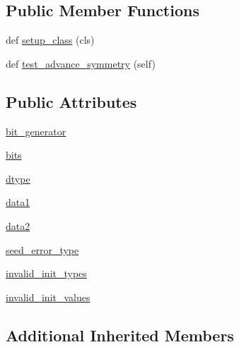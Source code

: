 \subsection*{Public Member Functions}
\begin{DoxyCompactItemize}
\item 
def \hyperlink{classnumpy_1_1random_1_1tests_1_1test__direct_1_1TestPCG64DXSM_a3e646542cb868d5f82de0fcd3b3f2964}{setup\+\_\+class} (cls)
\item 
def \hyperlink{classnumpy_1_1random_1_1tests_1_1test__direct_1_1TestPCG64DXSM_aae1696cb76a3c24ca72e1739e9b5fac0}{test\+\_\+advance\+\_\+symmetry} (self)
\end{DoxyCompactItemize}
\subsection*{Public Attributes}
\begin{DoxyCompactItemize}
\item 
\hyperlink{classnumpy_1_1random_1_1tests_1_1test__direct_1_1TestPCG64DXSM_a376a6831c53cc12b2d7a1037cf569d82}{bit\+\_\+generator}
\item 
\hyperlink{classnumpy_1_1random_1_1tests_1_1test__direct_1_1TestPCG64DXSM_ad60e40e1a5b577a5922e3d415954e39a}{bits}
\item 
\hyperlink{classnumpy_1_1random_1_1tests_1_1test__direct_1_1TestPCG64DXSM_a44fe571d4d4f1857ed9817ba9a639302}{dtype}
\item 
\hyperlink{classnumpy_1_1random_1_1tests_1_1test__direct_1_1TestPCG64DXSM_a89941230be74f340e1ede0facf628882}{data1}
\item 
\hyperlink{classnumpy_1_1random_1_1tests_1_1test__direct_1_1TestPCG64DXSM_a47ffd941c88cd0103692dd7b8e3422e6}{data2}
\item 
\hyperlink{classnumpy_1_1random_1_1tests_1_1test__direct_1_1TestPCG64DXSM_abb0757232e8d8bfb8a1e3a117127c713}{seed\+\_\+error\+\_\+type}
\item 
\hyperlink{classnumpy_1_1random_1_1tests_1_1test__direct_1_1TestPCG64DXSM_adbe471439de67f11a7306e42ff3c396d}{invalid\+\_\+init\+\_\+types}
\item 
\hyperlink{classnumpy_1_1random_1_1tests_1_1test__direct_1_1TestPCG64DXSM_a194ef3fa54329cc84b342920ab9165af}{invalid\+\_\+init\+\_\+values}
\end{DoxyCompactItemize}
\subsection*{Additional Inherited Members}


